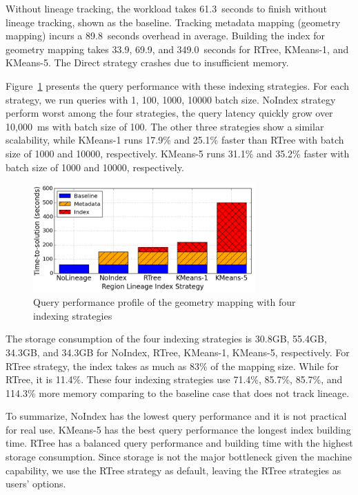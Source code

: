\documentclass{sig-alternate}
\begin{document}
Without lineage tracking, the workload takes 61.3~seconds to finish without lineage tracking, shown as the baseline.
Tracking metadata mapping (geometry mapping) incurs a 89.8~seconds overhead in average. 
Building the index for geometry mapping takes 33.9, 69.9, and 349.0~seconds for RTree, KMeans-1, and KMeans-5.
The Direct strategy crashes due to insufficient memory.

Figure~\ref{fig:sift-query} presents the query performance with these indexing strategies.
For each strategy, we run queries with {1, 100, 1000, 10000} batch size.
NoIndex strategy perform worst among the four strategies, the query latency quickly grow over 10,000~ms with batch size of 100.
The other three strategies show a similar scalability, while KMeans-1 runs 17.9\% and 25.1\% faster than RTree with batch size of 1000 and 10000, respectively.
KMeans-5 runs  31.1\% and 35.2\% faster with batch size of 1000 and 10000, respectively.


\begin{figure}[t]
\begin{center}
    \includegraphics[width=85mm]{pictures/SIFTQuery-Time}
\caption {Query performance profile of the geometry mapping with four indexing strategies
    \label{fig:sift-query}
}
\end{center}
\end{figure}

The storage consumption of the four indexing strategies is 30.8GB, 55.4GB, 34.3GB, and 34.3GB 
for NoIndex, RTree, KMeans-1, KMeans-5, respectively. 
For RTree strategy, the index takes as much as 83\% of the mapping size. 
While for RTree, it is 11.4\%.
These four indexing strategies use 71.4\%, 85.7\%, 85.7\%, and 114.3\% more memory comparing to the
baseline case that does not track lineage.

To summarize, NoIndex has the lowest query performance and it is not practical for real use.
KMeans-5 has the best query performance the longest index building time.
RTree has a balanced query performance and building time with the highest storage consumption.
Since storage is not the major bottleneck given the machine capability, we use the RTree strategy
as default, leaving the RTree strategies as users' options.
\end{document}
